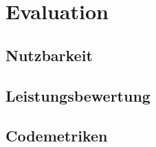 \chapter{Evaluation}
\label{chap:evaluation}


\section{Nutzbarkeit}
\label{sec:usability}

\section{Leistungsbewertung}
\label{sec:performance_measurement}

\section{Codemetriken}
\label{sec:codemetrics}